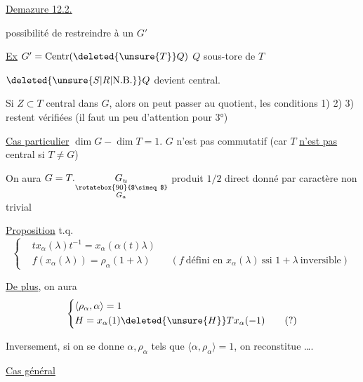 \uline{Demazure 12.2.}

possibilité de restreindre à un $G'$

\uline{Ex} \quad $G'=\mathrm{Centr}(\deleted{\unsure{T}}Q)$ \qquad $Q$ sous-tore de $T$

$\deleted{\unsure{S|R|\mathrm{N.B.}}}Q$ devient central.

Si $Z\subset T$ central dans $G$, alors on peut passer au quotient, les conditions 1) 2) 3) restent vérifiées (il faut un peu d'attention pour 3°)

\uline{Cas particulier} \quad $\dim G-\dim T=1$. $G$ n'est pas commutatif (car $T$ \uline{n'est pas} central si $T\neq G$)

On aura $G=T.\underset{\substack{\rotatebox{90}{$\simeq$}\\G_a}}{G_u}$ \quad produit $1/2$ direct donné par caractère non trivial

\uline{Proposition}
t.q.
\[
\left\{\begin{aligned}
&t x_\alpha(\lambda)t^{-1}=x_\alpha(\alpha(t)\lambda)\\
&f(x_\alpha(\lambda))=\rho_\alpha(1+\lambda)\qquad
  (f\ \text{défini en }x_\alpha(\lambda)\ \text{ssi }1+\lambda\ \text{inversible})
\end{aligned}\right.
\]

\uline{De plus}, on aura
\[
\left\{\begin{aligned}
&\langle\rho_\alpha,\alpha\rangle=1\\
&H=x_\alpha(1)\deleted{\unsure{H}}T x_\alpha(-1)\qquad (?)
\end{aligned}\right.
\]

Inversement, si on se donne $\alpha,\rho_\alpha$ tels que $\langle\alpha,\rho_\alpha\rangle=1$, on reconstitue \ldots.

\uline{Cas général}

